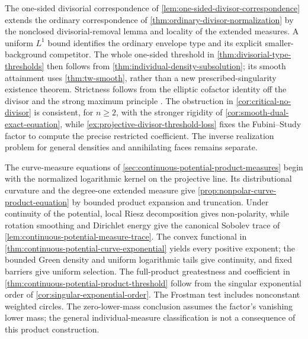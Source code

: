 \label{hist:divisorial-type-thresholds}
The one-sided divisorial correspondence of \cref{lem:one-sided-divisor-correspondence} extends the ordinary correspondence of \cref{thm:ordinary-divisor-normalization} by the nonclosed divisorial-removal lemma and locality of the extended measures. A uniform $L^1$ bound identifies the ordinary envelope type and its explicit smaller-background competitor. The whole one-sided threshold in \cref{thm:divisorial-type-thresholds} then follows from \cref{thm:individual-density-subsolution}; its smooth attainment uses \cref{thm:tw-smooth}, rather than a new prescribed-singularity existence theorem. Strictness follows from the elliptic cofactor identity off the divisor and the strong maximum principle \cite[Theorem~3.5]{GT01}. The obstruction in \cref{cor:critical-no-divisor} is consistent, for $n\geq2$, with the stronger rigidity of \cref{cor:smooth-dual-exact-equation}, while \cref{ex:projective-divisor-threshold-loss} fixes the Fubini--Study factor to compute the precise restricted coefficient. The inverse realization problem for general densities and annihilating faces remains separate.

\label{hist:continuous-potential-product-measures}
The curve-measure equations of \cref{sec:continuous-potential-product-measures} begin with the normalized logarithmic kernel on the projective line. Its distributional curvature and the degree-one extended measure give \cref{prop:nonpolar-curve-product-equation} by bounded product expansion and truncation. Under continuity of the potential, local Riesz decomposition gives non-polarity, while rotation smoothing and Dirichlet energy give the canonical Sobolev trace of \cref{lem:continuous-potential-measure-trace}. The convex functional in \cref{thm:continuous-potential-curve-exponential} yields every positive exponent; the bounded Green density and uniform logarithmic tails give continuity, and fixed barriers give uniform selection. The full-product greatestness and coefficient in \cref{thm:continuous-potential-product-threshold} follow from the singular exponential order of \cref{cor:singular-exponential-order}. The Frostman test includes nonconstant weighted circles. The zero-lower-mass conclusion assumes the factor's vanishing lower mass; the general individual-measure classification is not a consequence of this product construction.

